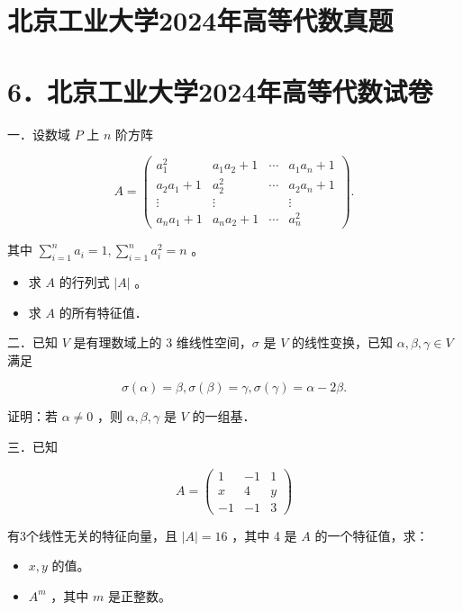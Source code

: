 \documentclass{article}
\begin{document}
\section*{北京工业大学2024年高等代数真题}
\section*{6．北京工业大学2024年高等代数试卷}
一．设数域 \(P\) 上 \(n\) 阶方阵

\[
A=\left(\begin{array}{cccc}
a_{1}^{2} & a_{1} a_{2}+1 & \cdots & a_{1} a_{n}+1 \\
a_{2} a_{1}+1 & a_{2}^{2} & \cdots & a_{2} a_{n}+1 \\
\vdots & \vdots & & \vdots \\
a_{n} a_{1}+1 & a_{n} a_{2}+1 & \cdots & a_{n}^{2}
\end{array}\right) .
\]

其中 \(\sum_{i=1}^{n} a_{i}=1, \sum_{i=1}^{n} a_{i}^{2}=n\) 。

\begin{itemize}

  \item[1．] 求 \(A\) 的行列式 \(|A|\) 。

  \item[2．] 求 \(A\) 的所有特征值．
\end{itemize}

二．已知 \(V\) 是有理数域上的 3 维线性空间，\(\sigma\) 是 \(V\) 的线性变换，已知 \(\alpha, \beta, \gamma \in V\) 满足

\[
\sigma(\alpha)=\beta, \sigma(\beta)=\gamma, \sigma(\gamma)=\alpha-2 \beta .
\]

证明：若 \(\alpha \neq 0\) ，则 \(\alpha, \beta, \gamma\) 是 \(V\) 的一组基．

三．已知

\[
A=\left(\begin{array}{ccc}
1 & -1 & 1 \\
x & 4 & y \\
-1 & -1 & 3
\end{array}\right)
\]

有3个线性无关的特征向量，且 \(|A|=16\) ，其中 4 是 \(A\) 的一个特征值，求：

\begin{itemize}

  \item[1．] \(x, y\) 的值。

  \item[2．] \(A^{m}\) ，其中 \(m\) 是正整数。
\end{itemize}
\end{document}
